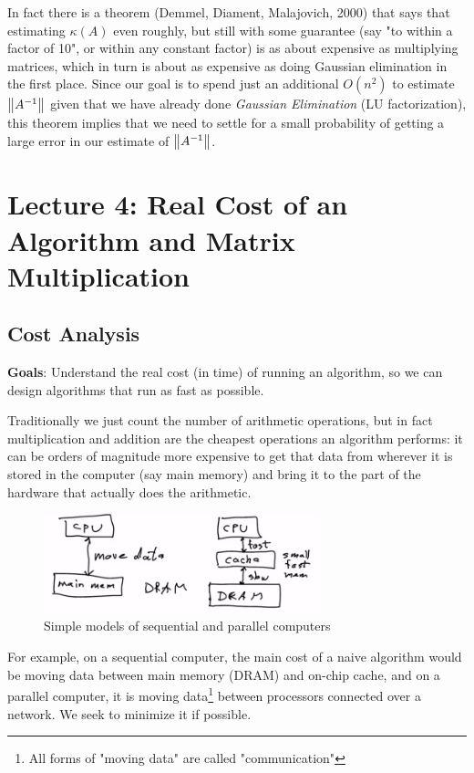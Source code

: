 \documentclass[11pt]{article}
\numberwithin{equation}{section}
\begin{document}
In fact there is a theorem (Demmel, Diament, Malajovich, 2000) that says that estimating $\kappa(A)$ even roughly, but still with some guarantee 
(say "to within a factor of 10", or within any constant  factor) is as about expensive as multiplying matrices, 
which in turn is about as expensive as doing Gaussian elimination in the first place. 
Since our goal is to spend just an additional $O(n^2)$ to estimate $\left\| A^{-1} \right\|$ given that we have already done \textit{Gaussian Elimination} (LU factorization), 
this theorem implies that we need to settle for a small probability of getting a large error in our estimate of $\left\| A^{-1} \right\|$.

\newpage
\section{Lecture 4: Real Cost of an Algorithm and Matrix Multiplication}
\subsection{Cost Analysis}
\textbf{Goals}: Understand the real cost (in time) of running an algorithm, so we can design algorithms that run as fast as possible.

Traditionally we just count the number of arithmetic operations, but in fact multiplication and addition are the cheapest operations an algorithm performs: 
it can be orders of magnitude more expensive to get that data from wherever it is stored in the computer (say main memory) and bring it to the part of the hardware that actually does the arithmetic.

\begin{figure}[h]
    \centering
    \includegraphics[width=8cm]{images/lec4-1.png}
    \caption{Simple models of sequential and parallel computers}
\end{figure}

For example, on a sequential computer, the main cost of a naive algorithm would be moving data between main memory (DRAM) and on-chip cache, 
and on a parallel computer, it is moving data\footnote{All forms of "moving data" are called "communication"} between processors connected over a network.
We seek to minimize it if possible.
\end{document}
